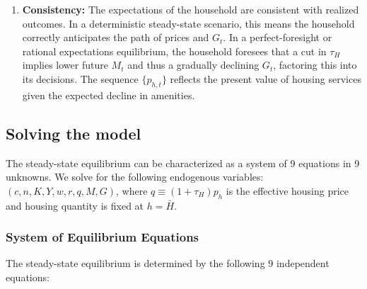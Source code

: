 \begin{enumerate}
\begin{itemize}
        \item \textbf{Capital market:} The firm’s capital input equals the household’s capital stock: $K_t$ (used in production) = $K_t$ (owned by household). The rental rate $r_t$ adjusts to clear this market.

        \item \textbf{Housing market:} $h_t = \bar{H}$. The total housing demanded by the household equals the fixed housing stock. The house price $p_{h,t}$ adjusts each period to clear the housing market.
    \end{itemize}

    \item \textbf{Consistency:} The expectations of the household are consistent with realized outcomes. In a deterministic steady-state scenario, this means the household correctly anticipates the path of prices and $G_t$. In a perfect-foresight or rational expectations equilibrium, the household foresees that a cut in $\tau_H$ implies lower future $M_t$ and thus a gradually declining $G_t$, factoring this into its decisions. The sequence $\{p_{h,t}\}$ reflects the present value of housing services given the expected decline in amenities.
\end{enumerate}

\subsection{Solving the model}

The steady-state equilibrium can be characterized as a system of 9 equations in 9 unknowns. We solve for the following endogenous variables: $(c, n, K, Y, w, r, q, M, G)$, where $q \equiv (1+\tau_H)p_h$ is the effective housing price and housing quantity is fixed at $h = \bar{H}$.

\subsubsection{System of Equilibrium Equations}

The steady-state equilibrium is determined by the following 9 independent equations:

